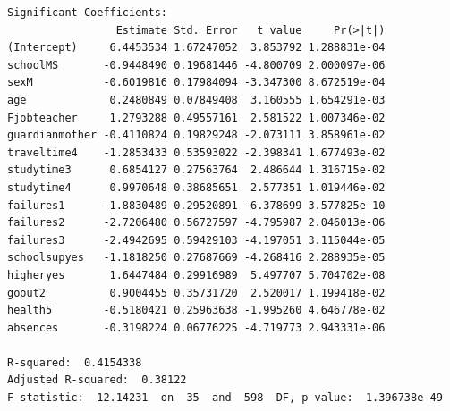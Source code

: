 \documentclass[
  letterpaper,
  DIV=11,
  numbers=noendperiod]{scrartcl}
\begin{document}
\begin{verbatim}
Significant Coefficients:
                 Estimate Std. Error   t value     Pr(>|t|)
(Intercept)     6.4453534 1.67247052  3.853792 1.288831e-04
schoolMS       -0.9448490 0.19681446 -4.800709 2.000097e-06
sexM           -0.6019816 0.17984094 -3.347300 8.672519e-04
age             0.2480849 0.07849408  3.160555 1.654291e-03
Fjobteacher     1.2793288 0.49557161  2.581522 1.007346e-02
guardianmother -0.4110824 0.19829248 -2.073111 3.858961e-02
traveltime4    -1.2853433 0.53593022 -2.398341 1.677493e-02
studytime3      0.6854127 0.27563764  2.486644 1.316715e-02
studytime4      0.9970648 0.38685651  2.577351 1.019446e-02
failures1      -1.8830489 0.29520891 -6.378699 3.577825e-10
failures2      -2.7206480 0.56727597 -4.795987 2.046013e-06
failures3      -2.4942695 0.59429103 -4.197051 3.115044e-05
schoolsupyes   -1.1818250 0.27687669 -4.268416 2.288935e-05
higheryes       1.6447484 0.29916989  5.497707 5.704702e-08
goout2          0.9004455 0.35731720  2.520017 1.199418e-02
health5        -0.5180421 0.25963638 -1.995260 4.646778e-02
absences       -0.3198224 0.06776225 -4.719773 2.943331e-06

R-squared:  0.4154338 
Adjusted R-squared:  0.38122 
F-statistic:  12.14231  on  35  and  598  DF, p-value:  1.396738e-49 
\end{verbatim}
\end{document}
